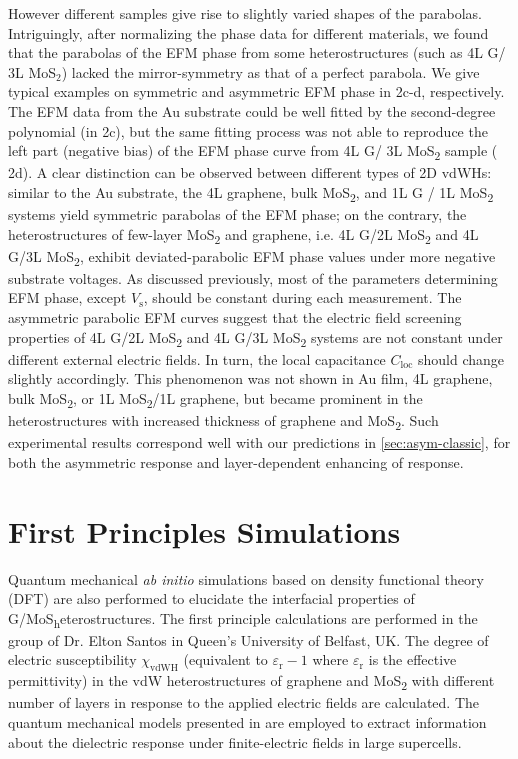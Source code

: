 %
However different
samples give rise to slightly varied shapes of the parabolas.
%
Intriguingly, after normalizing the phase data for different
materials, we found that the parabolas of the EFM phase from some
heterostructures (such as 4L G/ 3L MoS$_{2}$) lacked the
mirror-symmetry as that of a perfect parabola.
%
We give typical
examples on symmetric and asymmetric EFM phase in 
2c-d, respectively. The EFM data from the Au substrate could be well
fitted by the second-degree polynomial (in
 2c), but the same fitting process was not able to
reproduce the left part (negative bias) of the EFM phase curve from 4L G/ 3L
MoS\textsubscript{2} sample (
2d).
%
A clear distinction can be observed between different types of 2D
vdWHs: similar to the Au substrate, the 4L graphene, bulk
MoS\textsubscript{2}, and 1L G / 1L MoS\textsubscript{2} systems yield
symmetric parabolas of the EFM phase; on the contrary, the
heterostructures of few-layer MoS\textsubscript{2} and graphene,
i.e. 4L G/2L MoS\textsubscript{2} and 4L G/3L
MoS\textsubscript{2}, exhibit deviated-parabolic EFM phase
values under more negative substrate voltages.
%
%
As discussed previously, most of the parameters determining EFM phase,
except $V_{\mathrm{s}}$, should be constant during each
measurement. The asymmetric parabolic EFM curves suggest that the
electric field screening properties of 4L G/2L MoS\textsubscript{2} and 4L G/3L MoS\textsubscript{2} systems are not
constant under different external electric fields. In turn, the local capacitance $C_{\mathrm{loc}}$ should change slightly
accordingly. This phenomenon was not shown in Au film, 4L graphene,
bulk MoS\textsubscript{2}, or 1L MoS\textsubscript{2}/1L graphene, but
became prominent in the heterostructures with increased thickness of
graphene and MoS\textsubscript{2}.
%
Such experimental results correspond well with our predictions in
\autoref{sec:asym-classic}, for both the asymmetric response and
layer-dependent enhancing of response.

\section{First Principles Simulations}
\label{sec:mult-theor-model}

Quantum mechanical \textit{ab initio} simulations based on
density functional theory (DFT) are also performed to elucidate the interfacial properties of G/MoS\textsubscript
heterostructures.
The first principle calculations are performed in the group of Dr. Elton Santos in Queen's University of Belfast, UK.
%
The degree of electric susceptibility $\chi_{\mathrm{vdWH}}$ (equivalent to
$\varepsilon_{\mathrm{r}} - 1$ where $\varepsilon_{\mathrm{r}}$ is the
effective permittivity) in the vdW heterostructures of graphene and
MoS\textsubscript{2} with different number of layers in response to
the applied electric fields are calculated.
%
The quantum mechanical models presented in
\cite{Santos_2013_tunable_eps_gr,Santos_2013_ACSnano_kaxi} are
employed to extract information about the dielectric response under
finite-electric fields in large supercells.
%
%


